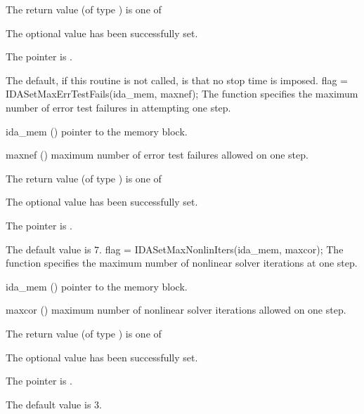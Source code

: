 {
  The return value  (of type ) is one of
  \begin{args}
  \item[\Id{IDA\_SUCCESS}] 
    The optional value has been successfully set.
  \item[\Id{IDA\_MEM\_NULL}]
    The  pointer is .
  \end{args}
}
{
  The default, if this routine is not called, is that no stop time is imposed.
}
{
flag = IDASetMaxErrTestFails(ida\_mem, maxnef);
}
{
  The function  specifies the
  maximum number of error test failures in attempting one step.
}
{
  \begin{args}
  \item[ida\_mem] ()
    pointer to the {\ida} memory block.
  \item[maxnef] ()
    maximum number of error test failures allowed on one step.
  \end{args}
}
{
  The return value  (of type ) is one of
  \begin{args}
  \item[\Id{IDA\_SUCCESS}] 
    The optional value has been successfully set.
  \item[\Id{IDA\_MEM\_NULL}]
    The  pointer is .
  \end{args}
}
{
  The default value is $7$.
}
{
flag = IDASetMaxNonlinIters(ida\_mem, maxcor);
}
{
  The function  specifies the maximum
  number of nonlinear solver iterations at one step.
}
{
  \begin{args}
  \item[ida\_mem] ()
    pointer to the {\ida} memory block.
  \item[maxcor] ()
    maximum number of nonlinear solver iterations allowed on one step.
  \end{args}
}
{
  The return value  (of type ) is one of
  \begin{args}
  \item[\Id{IDA\_SUCCESS}] 
    The optional value has been successfully set.
  \item[\Id{IDA\_MEM\_NULL}]
    The  pointer is .
  \end{args}
}
{
  The default value is $3$.
}
